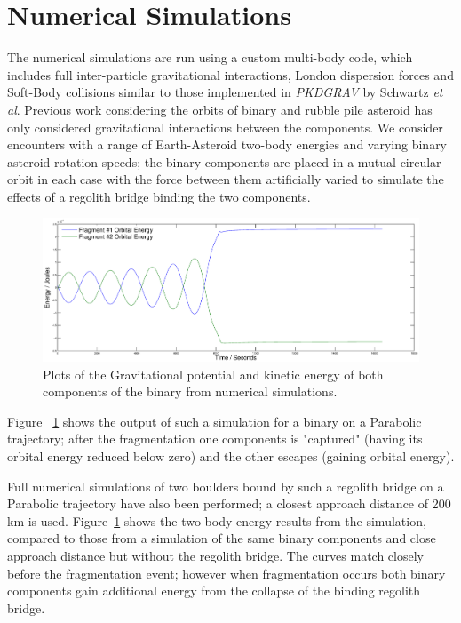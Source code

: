 \documentclass[letterpaper, preprint, paper,11pt]{AAS}	%
\begin{document}
\section{Numerical Simulations}
The numerical simulations are run using a custom multi-body code, which includes full inter-particle gravitational interactions, London dispersion forces and Soft-Body collisions similar to those implemented in \textit{PKDGRAV} by Schwartz \textit{et al}\cite{soft}.
Previous work considering the orbits of binary and rubble pile asteroid has only considered gravitational interactions between the components. We consider encounters with a range of Earth-Asteroid two-body energies and varying binary asteroid rotation speeds; the binary components are placed in a mutual circular orbit in each case with the force between them artificially varied to simulate the effects of a regolith bridge binding the two components.
\begin{figure}[H]
\centering
\includegraphics[width=\textwidth]{binary_num.eps} 
\caption{Plots of the Gravitational potential and kinetic energy of both components of the binary from numerical simulations.} 
\label{fig:Num}
\end{figure}
 Figure ~\ref{fig:Num} shows the output of such a simulation for a binary on a Parabolic trajectory; after the fragmentation one components is "captured" (having its orbital energy reduced below zero) and the other escapes (gaining orbital energy).  
 
Full numerical simulations of two boulders bound by such a regolith bridge on a Parabolic trajectory have also been performed; a closest approach distance of 200 km is used. Figure~\ref{} shows the two-body energy results from the simulation, compared to those from a simulation of the same binary components and close approach distance but without the regolith bridge. The curves match closely before the fragmentation event; however when fragmentation occurs both binary components gain additional energy from the collapse of the binding regolith bridge.   
\end{document}
